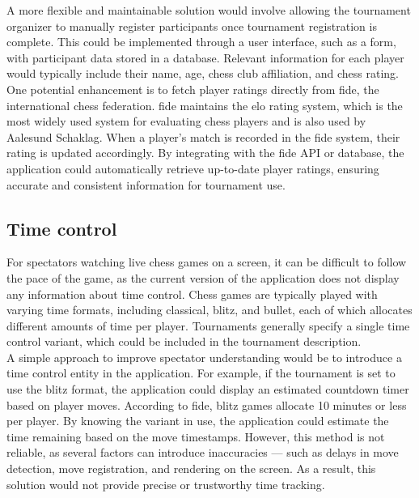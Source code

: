A more flexible and maintainable solution would involve allowing the tournament organizer to manually register participants once tournament registration is complete. This could be implemented through a user interface, such as a form, with participant data stored in a database. Relevant information for each player would typically include their name, age, chess club affiliation, and chess rating. \\

One potential enhancement is to fetch player ratings directly from \gls{fide}, the international chess federation. \gls{fide} maintains the \gls{elo} rating system, which is the most widely used system for evaluating chess players and is also used by Aalesund Schaklag. When a player’s match is recorded in the \gls{fide} system, their rating is updated accordingly. By integrating with the \gls{fide} API or database, the application could automatically retrieve up-to-date player ratings, ensuring accurate and consistent information for tournament use.

\subsection{Time control}
For spectators watching live chess games on a screen, it can be difficult to follow the pace of the game, as the current version of the application does not display any information about time control. Chess games are typically played with varying time formats, including \gls{classical}, \gls{blitz}, and \gls{bullet}, each of which allocates different amounts of time per player. Tournaments generally specify a single time control variant, which could be included in the tournament description. \\

A simple approach to improve spectator understanding would be to introduce a time control entity in the application. For example, if the tournament is set to use the \gls{blitz} format, the application could display an estimated countdown timer based on player moves. According to \gls{fide}, blitz games allocate 10 minutes or less per player. By knowing the variant in use, the application could estimate the time remaining based on the move timestamps. However, this method is not reliable, as several factors can introduce inaccuracies — such as delays in move detection, move registration, and rendering on the screen. As a result, this solution would not provide precise or trustworthy time tracking. \\

